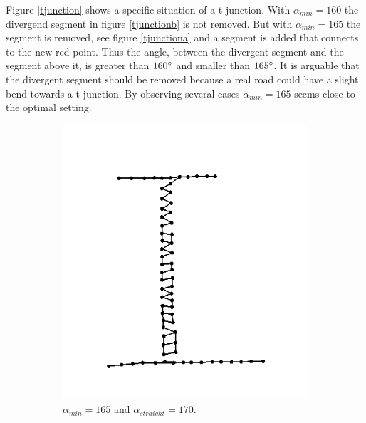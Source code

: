 \documentclass[11pt]{article}
\begin{document}
Figure \ref{tjunction} shows a specific situation of a t-junction. With $\alpha_{min}=160$ the divergend segment in figure \ref{tjunctionb} is not removed. But with $\alpha_{min}=165$ the segment is removed, see figure \ref{tjunctiona} and a segment is added that connects to the new red point. Thus the angle, between the divergent segment and the segment above it, is greater than $160\degree$ and smaller than $165\degree$.  It is arguable that the divergent segment should be removed because a real road could have a slight bend towards a t-junction. By observing several cases $\alpha_{min}=165$ seems close to the optimal setting.

\begin{figure}[h]
\centering
  \begin{subfigure}{0.4\linewidth}
  \centering
  \graphicspath{ {images/}}
  \includegraphics[width=\linewidth]{parallel165_165}
  \caption{$\alpha_{min}=165$ and $\alpha_{straight}=170$.}
  \label{parallel}
  \end{subfigure}
    \begin{subfigure}{0.4\linewidth}
  \centering
  \graphicspath{ {images/}}

\end{subfigure}
\end{figure}
\end{document}
